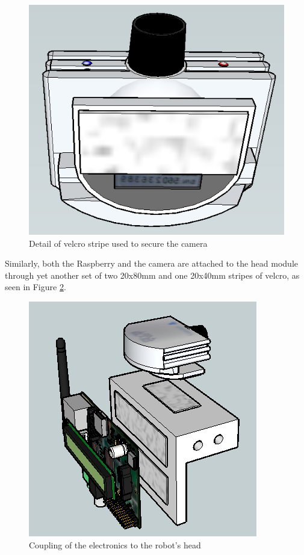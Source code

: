 \begin{minipage}{\linewidth}
\begin{minipage}{0.45\linewidth}
\begin{figure}[H]
              \includegraphics[scale=0.35]{images/Assembly/32.png}
			\caption{Detail of velcro stripe used to secure the camera}
			\label{ass32}
          \end{figure}
      \end{minipage}
  \end{minipage}
	\bigskip	


Similarly, both the Raspberry and the camera are attached to the head module through yet another set of two 20x80mm and one 20x40mm stripes of velcro, as seen in Figure \ref{ass33}.\\


	\bigskip
	\begin{figure}[H]
			\centering
			\includegraphics[scale=0.7]{images/Assembly/33.png}
			\caption{Coupling of the electronics to the robot's head }
			\label{ass33}
	\end{figure}
	\bigskip

